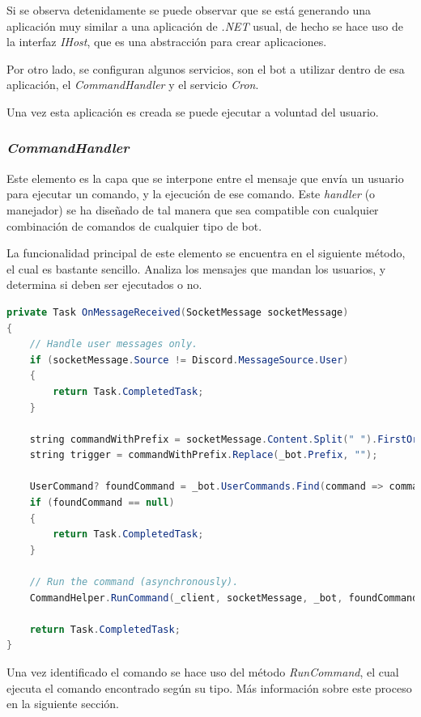 Si se observa detenidamente se puede observar que se está generando una aplicación muy similar a una aplicación de \textit{.NET} usual, de hecho se hace uso de la interfaz \textit{IHost}, que es una abstracción para crear aplicaciones.

Por otro lado, se configuran algunos servicios, son el bot a utilizar dentro de esa aplicación, el \textit{CommandHandler} y el servicio \textit{Cron}.

Una vez esta aplicación es creada se puede ejecutar a voluntad del usuario.

\subsubsection{\textit{CommandHandler}}

Este elemento es la capa que se interpone entre el mensaje que envía un usuario para ejecutar un comando, y la ejecución de ese comando. Este \textit{handler} (o manejador) se ha diseñado de tal manera que sea compatible con cualquier combinación de comandos de cualquier tipo de bot.

La funcionalidad principal de este elemento se encuentra en el siguiente método, el cual es bastante sencillo. Analiza los mensajes que mandan los usuarios, y determina si deben ser ejecutados o no.

\begin{lstlisting}[language=java]
private Task OnMessageReceived(SocketMessage socketMessage)
{
    // Handle user messages only.
    if (socketMessage.Source != Discord.MessageSource.User)
    {
        return Task.CompletedTask;
    }

    string commandWithPrefix = socketMessage.Content.Split(" ").FirstOrDefault() ?? "";
    string trigger = commandWithPrefix.Replace(_bot.Prefix, "");

    UserCommand? foundCommand = _bot.UserCommands.Find(command => command.Trigger.Equals(trigger));
    if (foundCommand == null)
    {
        return Task.CompletedTask;
    }

    // Run the command (asynchronously).
    CommandHelper.RunCommand(_client, socketMessage, _bot, foundCommand);

    return Task.CompletedTask;
}
\end{lstlisting}

Una vez identificado el comando se hace uso del método \textit{RunCommand}, el cual ejecuta el comando encontrado según su tipo. Más información sobre este proceso en la siguiente sección.





